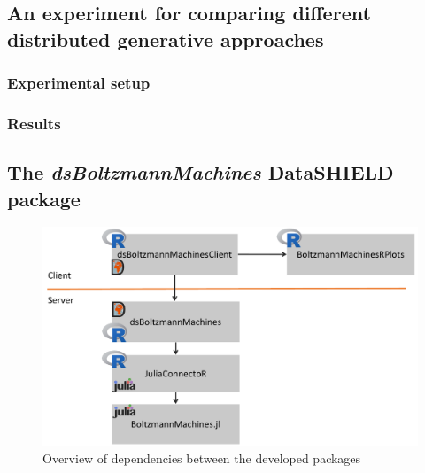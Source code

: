\documentclass[12pt]{article}
\newcommand{\apkg}[1]{\emph{#1}}
\begin{document}
\subsection{An experiment for comparing different distributed generative approaches }


\subsubsection{Experimental setup}


\subsubsection{Results}

\subsection{The \apkg{dsBoltzmannMachines} DataSHIELD package}





\begin{figure}[h]
   \centering
   \includegraphics[scale=0.5]{images/dsBoltzmannMachinesOverview.pdf}
   \caption{Overview of dependencies between the developed packages}
 \end{figure}
 
\end{document}

